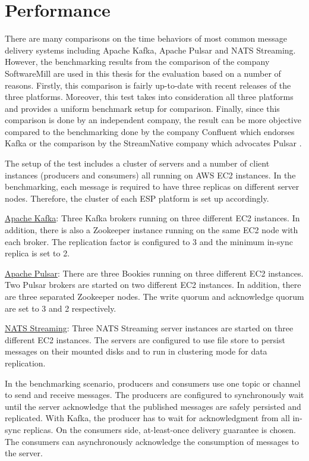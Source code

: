 \section{Performance} \label{section:performance}
There are many comparisons on the time behaviors of most common message delivery systems including Apache Kafka, Apache Pulsar and NATS Streaming. However, the benchmarking results from the comparison of the company SoftwareMill \cite{benchmarkfull} are used in this thesis for the evaluation based on a number of reasons. Firstly, this comparison is fairly up-to-date with recent releases of the three platforms. Moreover, this test takes into consideration all three platforms and provides a uniform benchmark setup for comparison. Finally, since this comparison is done by an independent company, the result can be more objective compared to the benchmarking done by the company Confluent which endorses Kafka \cite{benchmarkkafkapulsarrabbitmq} or the comparison by the StreamNative company which advocates Pulsar \cite{benchmarkkafkapulsar}.

The setup of the test includes a cluster of servers and a number of client instances (producers and consumers) all running on AWS EC2 instances. In the benchmarking, each message is required to have three replicas on different server nodes. Therefore, the cluster of each ESP platform is set up accordingly. 

\underline{Apache Kafka}: Three Kafka brokers running on three different EC2 instances. In addition, there is also a Zookeeper instance running on the same EC2 node with each broker. The replication factor is configured to 3 and the minimum in-sync replica is set to 2.

\underline{Apache Pulsar}: There are three Bookies running on three different EC2 instances. Two Pulsar brokers are started on two different EC2 instances. In addition, there are three separated Zookeeper nodes. The write quorum and acknowledge quorum are set to 3 and 2 respectively.

\underline{NATS Streaming}: Three NATS Streaming server instances are started on three different EC2 instances. The servers are configured to use file store to persist messages on their mounted disks and to run in clustering mode for data replication. 

In the benchmarking scenario, producers and consumers use one topic or channel to send and receive messages. The producers are configured to synchronously wait until the server acknowledge that the published messages are safely persisted and replicated. With Kafka, the producer has to wait for acknowledgment from all in-sync replicas. On the consumers side, at-least-once delivery guarantee is chosen. The consumers can asynchronously acknowledge the consumption of messages to the server.

